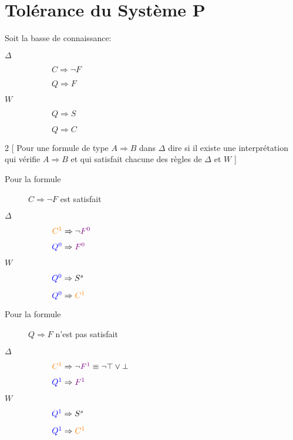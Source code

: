 \section{Tolérance du Système P}
Soit la basse de connaissance:
\begin{description}
\item[$\Delta$]
\begin{description}
\item[] $C \Rightarrow \neg F$
\item[] $Q \Rightarrow F$
\end{description}
\item[$W$]
\begin{description}
\item[] $Q \Rightarrow S$
\item[] $Q \Rightarrow C$
\end{description}
\end{description}

\begin{multicols}{2}
[
Pour une formule de type $A \Rightarrow B$ dans $\Delta$ dire si il existe une interprétation qui vérifie $A \Rightarrow B$ et qui satisfait chacune des règles de $\Delta$ et $W$
]
\begin{description}
\item[Pour la formule] $C \Rightarrow \neg F$ est satisfait
\item[$\Delta$]
\begin{description}
\item[] $\textcolor{orange}{C^1} \Rightarrow \neg \textcolor{violet}{F^0}$
\item[] $\textcolor{blue}{Q^0} \Rightarrow \textcolor{violet}{F^0}$
\end{description}
\item[$W$]
\begin{description}
\item[] $\textcolor{blue}{Q^0} \Rightarrow S^s$
\item[] $\textcolor{blue}{Q^0} \Rightarrow \textcolor{orange}{C^1}$
\end{description}
\end{description}

\begin{description}
\item[Pour la formule] $Q \Rightarrow F$ n'est pas satisfait
\item[$\Delta$]
\begin{description}
\item[] $\textcolor{orange}{C^1} \Rightarrow \neg \textcolor{violet}{F^1} \equiv \neg \top \vee \bot$
\item[] $\textcolor{blue}{Q^1} \Rightarrow \textcolor{violet}{F^1}$
\end{description}
\item[$W$]
\begin{description}
\item[] $\textcolor{blue}{Q^1} \Rightarrow S^s$
\item[] $\textcolor{blue}{Q^1} \Rightarrow \textcolor{orange}{C^1}$
\end{description}
\end{description}
\end{multicols}

